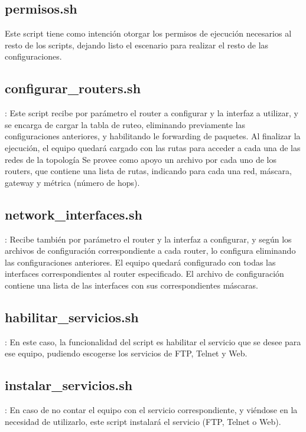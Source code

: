 \documentclass[12pt,titlepage]{article}
\begin{document}
\subsection{permisos.sh}
Este script tiene como intenci\'on otorgar los permisos de ejecuci\'on necesarios al resto de los scripts, dejando listo el escenario para realizar el resto de las configuraciones.

\subsection{configurar\_routers.sh}:
Este script recibe por par\'ametro el router a configurar y la interfaz a utilizar, y se encarga de cargar la tabla de ruteo, eliminando previamente las configuraciones anteriores, y habilitando le forwarding de paquetes.
Al finalizar la ejecuci\'on, el equipo quedar\'a cargado con las rutas para acceder a cada una de las redes de la topolog\'ia
Se provee como apoyo un archivo por cada uno de los routers, que contiene una lista de rutas, indicando para cada una red, m\'ascara, gateway y m\'etrica (n\'umero de hops).

\subsection{network\_interfaces.sh}:
Recibe tambi\'en por par\'ametro el router y la interfaz a configurar, y seg\'un los archivos de configuraci\'on correspondiente a cada router, lo configura eliminando las configuraciones anteriores.
El equipo quedar\'a configurado con todas las interfaces correspondientes al router especificado.
El archivo de configuraci\'on contiene una lista de las interfaces con sus correspondientes m\'ascaras.

\subsection{habilitar\_servicios.sh}:
En este caso, la funcionalidad del script es habilitar el servicio que se desee para ese equipo, pudiendo escogerse los servicios de FTP, Telnet y Web.

\subsection{instalar\_servicios.sh}:
En caso de no contar el equipo con el servicio correspondiente, y vi\'endose en la necesidad de utilizarlo, este script instalar\'a el servicio (FTP, Telnet o Web).
\end{document}
